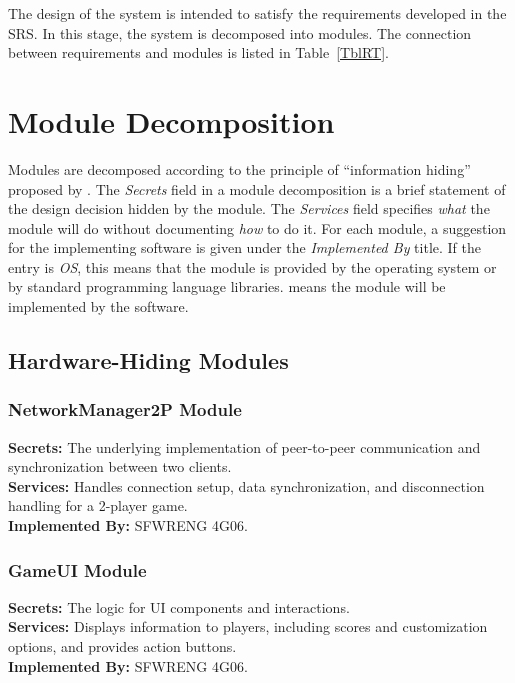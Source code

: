 \documentclass[12pt, titlepage]{article}
\begin{document}
The design of the system is intended to satisfy the requirements developed in
the SRS. In this stage, the system is decomposed into modules. The connection
between requirements and modules is listed in Table~\ref{TblRT}.


\section{Module Decomposition} \label{SecMD}

Modules are decomposed according to the principle of ``information hiding''
proposed by \citet{ParnasEtAl1984}. The \emph{Secrets} field in a module
decomposition is a brief statement of the design decision hidden by the
module. The \emph{Services} field specifies \emph{what} the module will do
without documenting \emph{how} to do it. For each module, a suggestion for the
implementing software is given under the \emph{Implemented By} title. If the
entry is \emph{OS}, this means that the module is provided by the operating
system or by standard programming language libraries.  \emph{\progname{}} means the
module will be implemented by the \progname{} software.

\subsection{Hardware-Hiding Modules}
\subsubsection{NetworkManager2P Module}
\textbf{Secrets:} The underlying implementation of peer-to-peer communication and synchronization between two clients.\\
\textbf{Services:} Handles connection setup, data synchronization, and disconnection handling for a 2-player game.\\
\textbf{Implemented By:} SFWRENG 4G06.

\subsubsection{GameUI Module}
\textbf{Secrets:} The logic for UI components and interactions.\\
\textbf{Services:} Displays information to players, including scores and customization options, and provides action buttons.\\
\textbf{Implemented By:} SFWRENG 4G06.
\end{document}
